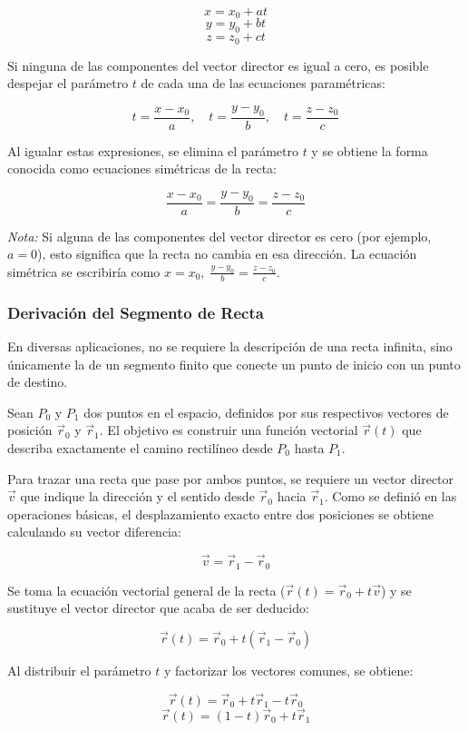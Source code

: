 \[ x = x_0 + at \]
\[ y = y_0 + bt \]
\[ z = z_0 + ct \]

Si ninguna de las componentes del vector director es igual a cero, es posible despejar el parámetro $t$ de cada una de las ecuaciones paramétricas:

\[ t = \frac{x - x_0}{a}, \quad t = \frac{y - y_0}{b}, \quad t = \frac{z - z_0}{c} \]

Al igualar estas expresiones, se elimina el parámetro $t$ y se obtiene la forma conocida como ecuaciones simétricas de la recta:

\[ \frac{x - x_0}{a} = \frac{y - y_0}{b} = \frac{z - z_0}{c} \]

\textit{Nota:} Si alguna de las componentes del vector director es cero (por ejemplo, $a = 0$), esto significa que la recta no cambia en esa dirección. La ecuación simétrica se escribiría como $x = x_0, \; \frac{y - y_0}{b} = \frac{z - z_0}{c}$.

\subsubsection{Derivación del Segmento de Recta}

En diversas aplicaciones, no se requiere la descripción de una recta infinita, sino únicamente la de un segmento finito que conecte un punto de inicio con un punto de destino.

Sean $P_0$ y $P_1$ dos puntos en el espacio, definidos por sus respectivos vectores de posición $\vec{r}_0$ y $\vec{r}_1$. El objetivo es construir una función vectorial $\vec{r}(t)$ que describa exactamente el camino rectilíneo desde $P_0$ hasta $P_1$. 

Para trazar una recta que pase por ambos puntos, se requiere un vector director $\vec{v}$ que indique la dirección y el sentido desde $\vec{r}_0$ hacia $\vec{r}_1$. Como se definió en las operaciones básicas, el desplazamiento exacto entre dos posiciones se obtiene calculando su vector diferencia:

\[ \vec{v} = \vec{r}_1 - \vec{r}_0 \]

Se toma la ecuación vectorial general de la recta ($\vec{r}(t) = \vec{r}_0 + t\vec{v}$) y se sustituye el vector director que acaba de ser deducido:

\[ \vec{r}(t) = \vec{r}_0 + t(\vec{r}_1 - \vec{r}_0) \]

Al distribuir el parámetro $t$ y factorizar los vectores comunes, se obtiene:

\[ \vec{r}(t) = \vec{r}_0 + t\vec{r}_1 - t\vec{r}_0 \]
\[ \vec{r}(t) = (1 - t)\vec{r}_0 + t\vec{r}_1 \]


